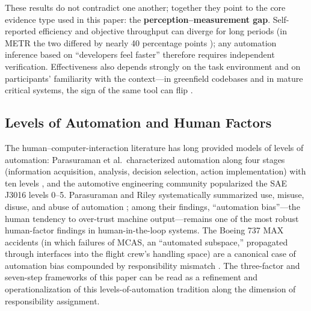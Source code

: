 \documentclass[11pt]{article}
\begin{document}
These results do not contradict one another; together they point to the
core evidence type used in this paper: the \textbf{perception--measurement
gap}. Self-reported efficiency and objective throughput can diverge for
long periods (in METR the two differed by nearly 40 percentage points
\cite{metr}); any automation inference based on ``developers feel faster''
therefore requires independent verification. Effectiveness also depends
strongly on the task environment and on participants' familiarity with the
context---in greenfield codebases and in mature critical systems, the sign
of the same tool can flip \cite{metr,google_rct}.

\subsection{Levels of Automation and Human Factors}
The human--computer-interaction literature has long provided models of
levels of automation: Parasuraman et al.\ characterized automation along
four stages (information acquisition, analysis, decision selection, action
implementation) with ten levels \cite{parasuraman2000}, and the automotive
engineering community popularized the SAE J3016 levels 0--5. Parasuraman
and Riley systematically summarized use, misuse, disuse, and abuse of
automation \cite{parasuraman1997}; among their findings,
``automation bias''---the human tendency to over-trust machine
output---remains one of the most robust human-factor findings in
human-in-the-loop systems. The Boeing 737 MAX accidents (in which failures
of MCAS, an ``automated subspace,'' propagated through interfaces into the
flight crew's handling space) are a canonical case of automation bias
compounded by responsibility mismatch \cite{boeing}. The three-factor and
seven-step frameworks of this paper can be read as a refinement and
operationalization of this levels-of-automation tradition along the
dimension of responsibility assignment.
\end{document}
